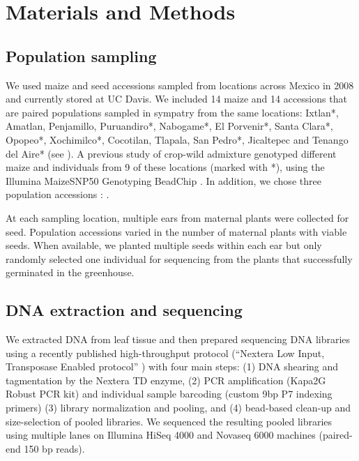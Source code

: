\section*{Materials and Methods}

\subsection*{Population sampling}
We used maize and \mexicana seed accessions sampled from locations across Mexico in 2008 \cite{Hufford:2013_crop_wild} and currently stored at UC Davis.
We included 14 maize and 14 \mexicana accessions that are paired populations sampled in sympatry from the same locations: Ixtlan*, Amatlan, Penjamillo, Puruandiro*, Nabogame*, El Porvenir*, Santa Clara*, Opopeo*, Xochimilco*, Cocotilan, Tlapala, San Pedro*, Jicaltepec and Tenango del Aire* (see ). A previous study of crop-wild admixture genotyped different maize and \mexicana individuals from 9 of these locations (marked with *), using the Illumina MaizeSNP50 Genotyping BeadChip \cite{Hufford:2013_crop_wild}. In addition, we chose three population accessions : .

At each sampling location, multiple ears from maternal plants were collected for seed. 
Population accessions varied in the number of maternal plants with viable seeds. 
When available, we planted multiple seeds within each ear but only randomly selected one individual for sequencing from the plants that successfully germinated in the greenhouse.

\subsection*{DNA extraction and sequencing}
We extracted DNA from leaf tissue and then prepared sequencing DNA libraries using a recently published high-throughput protocol (“Nextera Low Input, Transposase Enabled protocol” \cite{Rowan:2019}) with four main steps: (1) DNA shearing and tagmentation by the Nextera TD enzyme, (2) PCR amplification (Kapa2G Robust PCR kit) and individual sample barcoding (custom 9bp P7 indexing primers) (3) library normalization and pooling, and (4) bead-based clean-up and size-selection of pooled libraries. 
We sequenced the resulting pooled libraries using multiple lanes on Illumina HiSeq 4000 and Novaseq 6000 machines (paired-end 150 bp reads).

